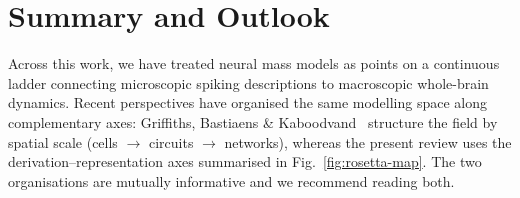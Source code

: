\documentclass[12pt]{article}
\numberwithin{equation}{section}
\newcommand{\rev}[1]{\begingroup\color{navyblue}#1\endgroup}
\begin{document}




\clearpage \section{Summary and Outlook}


\label{sec:Closing}


\rev{Across this work, we have treated neural mass models as points on a continuous ladder connecting microscopic spiking descriptions to macroscopic whole-brain dynamics. Recent perspectives have organised the same modelling space along complementary axes: Griffiths, Bastiaens \& Kaboodvand~\cite{griffiths_bastiaens_kaboodvand_2021} structure the field by spatial scale (cells $\to$ circuits $\to$ networks), whereas the present review uses the derivation--representation axes \rev{summarised in Fig.~\ref{fig:rosetta-map}}. The two organisations are mutually informative and we recommend reading both.}
\end{document}
